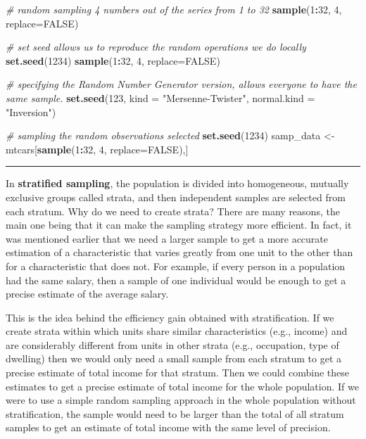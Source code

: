 \documentclass[
]{article}
\newenvironment{Shaded}{\begin{snugshade}}{\end{snugshade}}
\newcommand{\AttributeTok}[1]{\textcolor[rgb]{0.13,0.29,0.53}{#1}}
\newcommand{\CommentTok}[1]{\textcolor[rgb]{0.56,0.35,0.01}{\textit{#1}}}
\newcommand{\ConstantTok}[1]{\textcolor[rgb]{0.56,0.35,0.01}{#1}}
\newcommand{\DecValTok}[1]{\textcolor[rgb]{0.00,0.00,0.81}{#1}}
\newcommand{\FunctionTok}[1]{\textcolor[rgb]{0.13,0.29,0.53}{\textbf{#1}}}
\newcommand{\NormalTok}[1]{#1}
\newcommand{\OtherTok}[1]{\textcolor[rgb]{0.56,0.35,0.01}{#1}}
\newcommand{\SpecialCharTok}[1]{\textcolor[rgb]{0.81,0.36,0.00}{\textbf{#1}}}
\newcommand{\StringTok}[1]{\textcolor[rgb]{0.31,0.60,0.02}{#1}}
\begin{document}
\begin{Shaded}
\begin{Highlighting}[]
\CommentTok{\# random sampling 4 numbers out of the series from 1 to 32}
\FunctionTok{sample}\NormalTok{(}\DecValTok{1}\SpecialCharTok{:}\DecValTok{32}\NormalTok{, }\DecValTok{4}\NormalTok{, }\AttributeTok{replace=}\ConstantTok{FALSE}\NormalTok{)}

\CommentTok{\# set seed allows us to reproduce the random operations we do locally}
\FunctionTok{set.seed}\NormalTok{(}\DecValTok{1234}\NormalTok{)}
\FunctionTok{sample}\NormalTok{(}\DecValTok{1}\SpecialCharTok{:}\DecValTok{32}\NormalTok{, }\DecValTok{4}\NormalTok{, }\AttributeTok{replace=}\ConstantTok{FALSE}\NormalTok{)}

\CommentTok{\# specifying the Random Number Generator version, allows everyone to have the same sample. }
\FunctionTok{set.seed}\NormalTok{(}\DecValTok{123}\NormalTok{, }\AttributeTok{kind =} \StringTok{"Mersenne{-}Twister"}\NormalTok{, }\AttributeTok{normal.kind =}  \StringTok{"Inversion"}\NormalTok{)}

\CommentTok{\# sampling the random observations selected}
\FunctionTok{set.seed}\NormalTok{(}\DecValTok{1234}\NormalTok{)}
\NormalTok{samp\_data }\OtherTok{\textless{}{-}}\NormalTok{ mtcars[}\FunctionTok{sample}\NormalTok{(}\DecValTok{1}\SpecialCharTok{:}\DecValTok{32}\NormalTok{, }\DecValTok{4}\NormalTok{, }\AttributeTok{replace=}\ConstantTok{FALSE}\NormalTok{),]}
\end{Highlighting}
\end{Shaded}

\begin{center}\rule{0.5\linewidth}{0.5pt}\end{center}

In \textbf{stratified sampling}, the population is divided into homogeneous,
mutually exclusive groups called strata, and then independent samples
are selected from each stratum. Why do we need to create strata? There
are many reasons, the main one being that it can make the sampling
strategy more efficient. In fact, it was mentioned earlier that we need
a larger sample to get a more accurate estimation of a characteristic
that varies greatly from one unit to the other than for a characteristic
that does not. For example, if every person in a population had the same
salary, then a sample of one individual would be enough to get a precise
estimate of the average salary.

This is the idea behind the efficiency gain obtained with
stratification. If we create strata within which units share similar
characteristics (e.g., income) and are considerably different from units
in other strata (e.g., occupation, type of dwelling) then we would only
need a small sample from each stratum to get a precise estimate of total
income for that stratum. Then we could combine these estimates to get a
precise estimate of total income for the whole population. If we were to
use a simple random sampling approach in the whole population without
stratification, the sample would need to be larger than the total of all
stratum samples to get an estimate of total income with the same level
of precision.
\end{document}
